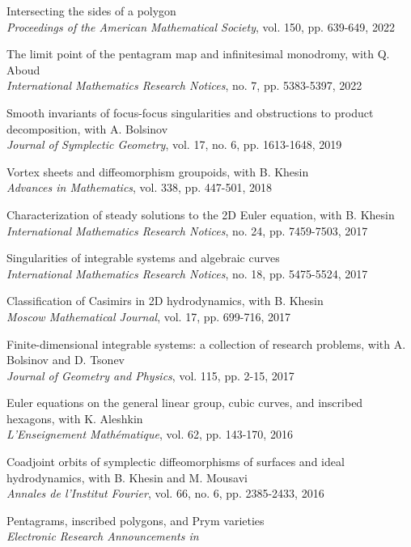 \documentclass[a4paper, 12pt]{article}
\begin{document}
\begin{compactenum}
\item {Intersecting the sides of a polygon}\\\textit{Proceedings of the American Mathematical Society}, vol. 150, pp. 639-649, 2022
\item {The limit point of the pentagram map and infinitesimal monodromy}, with Q.\,Aboud\\\textit{International Mathematics Research Notices}, no. 7, pp. 5383-5397, 2022
\item {Smooth invariants of focus-focus singularities and obstructions to product decomposition}, with
A. Bolsinov\\\textit{Journal of Symplectic Geometry}, vol. 17, no. 6, pp. 1613-1648, 2019
\item {Vortex sheets and diffeomorphism groupoids}, with B. Khesin\\\textit{Advances in Mathematics}, vol. 338, pp. 447-501, 2018
\item {Characterization of steady solutions to the 2D Euler equation}, with B. Khesin\\\textit{International
Mathematics Research Notices},  no. 24, pp. 7459-7503, 2017
\item {Singularities of integrable systems and algebraic curves}\\\textit{International Mathematics Research
Notices},  no. 18, pp. 5475-5524, 2017
\item {Classification of Casimirs in 2D hydrodynamics}, with B. Khesin\\\textit{Moscow Mathematical
Journal}, vol. 17, pp. 699-716, 2017
\item {Finite-dimensional integrable systems: a collection of research problems}, with A. Bolsinov and
D. Tsonev\\\textit{Journal of Geometry and Physics}, vol. 115, pp. 2-15, 2017
\item {Euler equations on the general linear group, cubic curves, and inscribed hexagons}, with
K. Aleshkin\\\textit{L'Enseignement Math\'ematique}, vol. 62, pp. 143-170, 2016 
\item {Coadjoint orbits of symplectic diffeomorphisms of surfaces and ideal hydrodynamics}, with
B. Khesin and M. Mousavi\\\textit{Annales de l'Institut Fourier}, vol. 66, no. 6, pp. 2385-2433, 2016
\item {Pentagrams, inscribed polygons, and Prym varieties}\\\textit{Electronic Research Announcements in
}
\end{compactenum}
\end{document}
